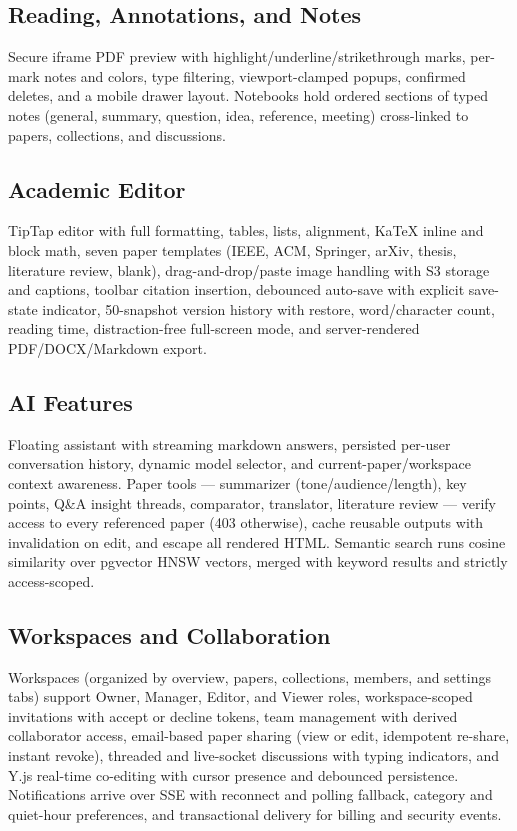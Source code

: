 \subsection{Reading, Annotations, and Notes}
Secure iframe PDF preview with highlight/underline/strikethrough marks,
per-mark notes and colors, type filtering, viewport-clamped popups, confirmed
deletes, and a mobile drawer layout. Notebooks hold ordered sections of typed
notes (general, summary, question, idea, reference, meeting) cross-linked to
papers, collections, and discussions.

\subsection{Academic Editor}
TipTap editor with full formatting, tables, lists, alignment, KaTeX inline and
block math, seven paper templates (IEEE, ACM, Springer, arXiv, thesis,
literature review, blank), drag-and-drop/paste image handling with S3 storage
and captions, toolbar citation insertion, debounced auto-save with explicit
save-state indicator, 50-snapshot version history with restore, word/character
count, reading time, distraction-free full-screen mode, and server-rendered
PDF/DOCX/Markdown export.

\subsection{AI Features}
Floating assistant with streaming markdown answers, persisted per-user
conversation history, dynamic model selector, and current-paper/workspace
context awareness. Paper tools --- summarizer (tone/audience/length), key
points, Q\&A insight threads, comparator, translator, literature review ---
verify access to every referenced paper (403 otherwise), cache reusable
outputs with invalidation on edit, and escape all rendered HTML. Semantic
search runs cosine similarity over pgvector HNSW vectors, merged with keyword
results and strictly access-scoped.

\subsection{Workspaces and Collaboration}
Workspaces (organized by overview, papers, collections, members, and settings
tabs) support Owner, Manager, Editor, and Viewer roles, workspace-scoped
invitations with accept or decline tokens, team management with derived
collaborator access, email-based paper sharing (view or edit, idempotent
re-share, instant revoke), threaded and live-socket discussions with typing
indicators, and Y.js real-time co-editing with cursor presence and debounced
persistence. Notifications arrive over SSE with reconnect and polling fallback,
category and quiet-hour preferences, and transactional delivery for
billing and security events.


